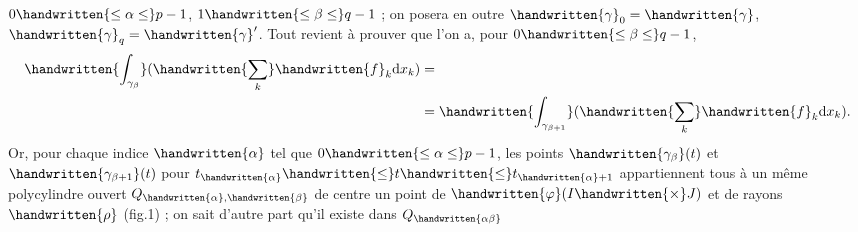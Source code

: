 $0\handwritten{\leq\alpha\leq}p-1$, $1\handwritten{\leq\beta\leq}q-1$ ; on posera en outre $\handwritten{\gamma}_0=\handwritten{\gamma}$, $\handwritten{\gamma}_q=\handwritten{\gamma}'$. Tout revient à prouver que l'on a, pour $0\handwritten{\leq\beta\leq}q-1$,
\[
\begin{aligned}
\handwritten{\int_{\gamma_\beta}}(\handwritten{\sum_k}\handwritten{f}_k\mathrm{d}x_k)&={}\\
&={}\handwritten{\int_{\gamma_{\beta+1}}}(\handwritten{\sum_k}\handwritten{f}_k\mathrm{d}x_k).
\end{aligned}
\]
Or, pour chaque indice $\handwritten{\alpha}$ tel que $0\handwritten{\leq\alpha\leq}p-1$, les points $\handwritten{\gamma_\beta}(t)$ et $\handwritten{\gamma_{\beta+1}}(t)$ pour $t_{\handwritten{\alpha}}\handwritten{\leq}t\handwritten{\leq}t_{\handwritten{\alpha}+1}$ appartiennent tous à un même polycylindre ouvert $Q_{\handwritten{\alpha},\handwritten{\beta}}$ de centre un point de $\handwritten{\varphi}(I\handwritten{\times}J)$ et de rayons $\handwritten{\rho}$ (fig.1) ; on sait d'autre part qu'il existe dans $Q_{\handwritten{\alpha\beta}}$
